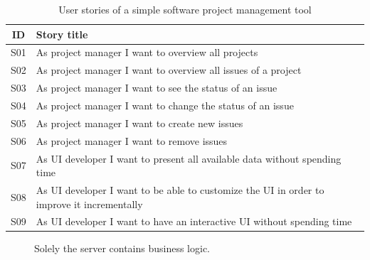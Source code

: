 \begin{table}
  \begin{center}
    \begin{tabular}{ |c|l| }
      \hline
      ID & Story title \\
      \hline
      S01 & As project manager I want to overview all projects \\
      S02 & As project manager I want to overview all issues of a project \\
      S03 & As project manager I want to see the status of an issue \\
      S04 & As project manager I want to change the status of an issue \\
      S05 & As project manager I want to create new issues \\
      S06 & As project manager I want to remove issues \\
      S07 & As UI developer I want to present all available data without spending time \\
      S08 & As UI developer I want to be able to customize the UI in order to improve it incrementally \\
      S09 & As UI developer I want to have an interactive UI without spending time \\
      \hline
    \end{tabular}
    \caption{User stories of a simple software project management tool}
  \end{center}
\end{table}

\begin{figure}[!htb]
  \caption{Solely the server contains business logic.}
\end{figure}

